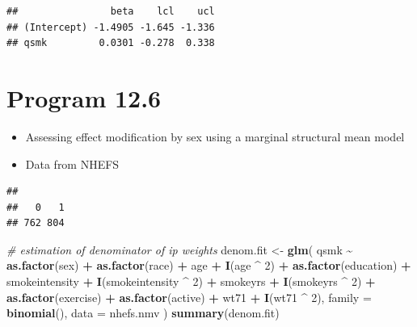 \documentclass[
  10pt,
]{book}
\newenvironment{Shaded}{\begin{snugshade}}{\end{snugshade}}
\newcommand{\CommentTok}[1]{\textcolor[rgb]{0.56,0.35,0.01}{\textit{#1}}}
\newcommand{\DataTypeTok}[1]{\textcolor[rgb]{0.13,0.29,0.53}{#1}}
\newcommand{\DecValTok}[1]{\textcolor[rgb]{0.00,0.00,0.81}{#1}}
\newcommand{\KeywordTok}[1]{\textcolor[rgb]{0.13,0.29,0.53}{\textbf{#1}}}
\newcommand{\NormalTok}[1]{#1}
\newcommand{\OperatorTok}[1]{\textcolor[rgb]{0.81,0.36,0.00}{\textbf{#1}}}
\newcommand{\StringTok}[1]{\textcolor[rgb]{0.31,0.60,0.02}{#1}}
\providecommand{\tightlist}{%
  \setlength{\itemsep}{0pt}\setlength{\parskip}{0pt}}
\begin{document}
\begin{verbatim}
##                beta    lcl    ucl
## (Intercept) -1.4905 -1.645 -1.336
## qsmk         0.0301 -0.278  0.338
\end{verbatim}

\hypertarget{program-12.6}{%
\section{Program 12.6}\label{program-12.6}}

\begin{itemize}
\tightlist
\item
  Assessing effect modification by sex using a marginal structural mean model
\item
  Data from NHEFS
\end{itemize}

\begin{Shaded}
\end{Shaded}

\begin{verbatim}
## 
##   0   1 
## 762 804
\end{verbatim}

\begin{Shaded}
\begin{Highlighting}[]
\CommentTok{\# estimation of denominator of ip weights}
\NormalTok{denom.fit \textless{}{-}}
\StringTok{  }\KeywordTok{glm}\NormalTok{(}
\NormalTok{    qsmk }\OperatorTok{\textasciitilde{}}\StringTok{ }\KeywordTok{as.factor}\NormalTok{(sex) }\OperatorTok{+}\StringTok{ }\KeywordTok{as.factor}\NormalTok{(race) }\OperatorTok{+}\StringTok{ }\NormalTok{age }\OperatorTok{+}\StringTok{ }\KeywordTok{I}\NormalTok{(age }\OperatorTok{\^{}}\StringTok{ }\DecValTok{2}\NormalTok{) }\OperatorTok{+}
\StringTok{      }\KeywordTok{as.factor}\NormalTok{(education) }\OperatorTok{+}\StringTok{ }\NormalTok{smokeintensity }\OperatorTok{+}
\StringTok{      }\KeywordTok{I}\NormalTok{(smokeintensity }\OperatorTok{\^{}}\StringTok{ }\DecValTok{2}\NormalTok{) }\OperatorTok{+}\StringTok{ }\NormalTok{smokeyrs }\OperatorTok{+}\StringTok{ }\KeywordTok{I}\NormalTok{(smokeyrs }\OperatorTok{\^{}}\StringTok{ }\DecValTok{2}\NormalTok{) }\OperatorTok{+}
\StringTok{      }\KeywordTok{as.factor}\NormalTok{(exercise) }\OperatorTok{+}\StringTok{ }\KeywordTok{as.factor}\NormalTok{(active) }\OperatorTok{+}\StringTok{ }\NormalTok{wt71 }\OperatorTok{+}\StringTok{ }\KeywordTok{I}\NormalTok{(wt71 }\OperatorTok{\^{}}\StringTok{ }\DecValTok{2}\NormalTok{),}
    \DataTypeTok{family =} \KeywordTok{binomial}\NormalTok{(),}
    \DataTypeTok{data =}\NormalTok{ nhefs.nmv}
\NormalTok{  )}
\KeywordTok{summary}\NormalTok{(denom.fit)}
\end{Highlighting}
\end{Shaded}
\end{document}
